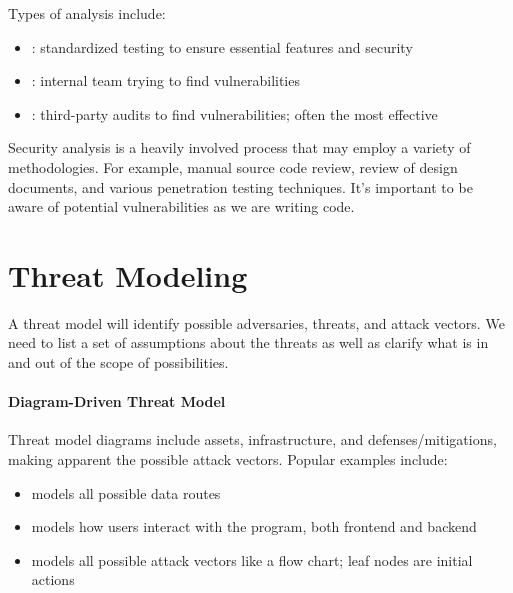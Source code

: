 \documentclass[code]{amznotes}
\begin{document}
Types of analysis include:
\begin{itemize}[noitemsep]
    \item {}: standardized testing to ensure essential features and security
    \item {}: internal team trying to find vulnerabilities
    \item {}: third-party audits to find vulnerabilities; often the most effective
\end{itemize}

Security analysis is a heavily involved process that may employ a variety of methodologies. For example, manual source code review, review of design documents, and various penetration testing techniques. It's important to be aware of potential vulnerabilities as we are writing code.

\section{Threat Modeling}
A threat model will identify possible adversaries, threats, and attack vectors. We need to list a set of assumptions about the threats as well as clarify what is in and out of the scope of possibilities.

\paragraph{Diagram-Driven Threat Model}
Threat model diagrams include assets, infrastructure, and defenses/mitigations, making apparent the possible attack vectors. Popular examples include:
\begin{itemize}[noitemsep]
    \item {} models all possible data routes
    \item {} models how users interact with the program, both frontend and backend
    \item {} models all possible attack vectors like a flow chart; leaf nodes are initial actions
\end{itemize}
\end{document}
